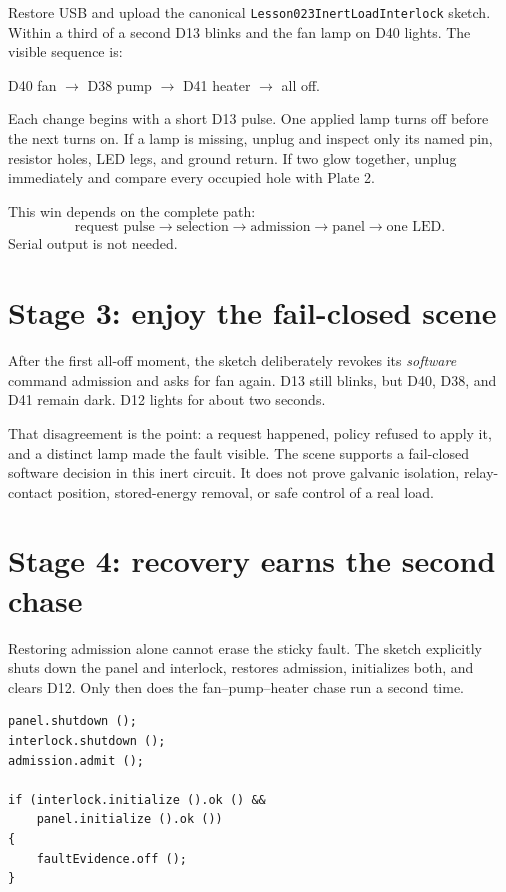 \documentclass[11pt]{article}
\begin{document}
Restore USB and upload the canonical
\texttt{Lesson023InertLoadInterlock} sketch. Within a third of a second D13
blinks and the fan lamp on D40 lights. The visible sequence is:

\begin{center}
D40 fan \(\rightarrow\) D38 pump \(\rightarrow\) D41 heater
\(\rightarrow\) all off.
\end{center}

Each change begins with a short D13 pulse. One applied lamp turns off before
the next turns on. If a lamp is missing, unplug and inspect only its named pin,
resistor holes, LED legs, and ground return. If two glow together, unplug
immediately and compare every occupied hole with Plate 2.

This win depends on the complete path:
\[
\text{request pulse}\rightarrow\text{selection}\rightarrow
\text{admission}\rightarrow\text{panel}\rightarrow\text{one LED}.
\]
Serial output is not needed.

\section*{Stage 3: enjoy the fail-closed scene}

After the first all-off moment, the sketch deliberately revokes its
\emph{software} command admission and asks for fan again. D13 still blinks,
but D40, D38, and D41 remain dark. D12 lights for about two seconds.

That disagreement is the point: a request happened, policy refused to apply
it, and a distinct lamp made the fault visible. The scene supports a
fail-closed software decision in this inert circuit. It does not prove
galvanic isolation, relay-contact position, stored-energy removal, or safe
control of a real load.

\section*{Stage 4: recovery earns the second chase}

Restoring admission alone cannot erase the sticky fault. The sketch explicitly
shuts down the panel and interlock, restores admission, initializes both, and
clears D12. Only then does the fan--pump--heater chase run a second time.

\begin{lstlisting}[style=adkcpp]
panel.shutdown ();
interlock.shutdown ();
admission.admit ();

if (interlock.initialize ().ok () &&
    panel.initialize ().ok ())
{
    faultEvidence.off ();
}
\end{lstlisting}
\end{document}
